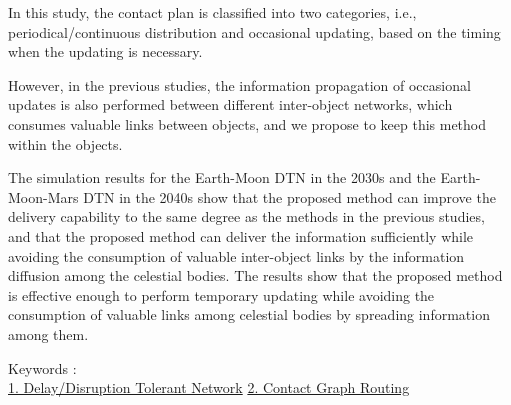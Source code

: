 \begin{spacing}{1.1}
In this study, the contact plan is classified into two categories, i.e., periodical/continuous distribution and occasional updating, based on the timing when the updating is necessary.

However, in the previous studies, the information propagation of occasional updates is also performed between different inter-object networks, which consumes valuable links between objects, and we propose to keep this method within the objects. 

The simulation results for the Earth-Moon DTN in the 2030s and the Earth-Moon-Mars DTN in the 2040s show that the proposed method can improve the delivery capability to the same degree as the methods in the previous studies, and that the proposed method can deliver the information sufficiently while avoiding the consumption of valuable inter-object links by the information diffusion among the celestial bodies. The results show that the proposed method is effective enough to perform temporary updating while avoiding the consumption of valuable links among celestial bodies by spreading information among them.
~ \\

\end{spacing}
Keywords : \\
\underline{1. Delay/Disruption Tolerant Network} 
\underline{2. Contact Graph Routing} 
\begin{flushright}
\edept \\
\eauthor
\end{flushright}
